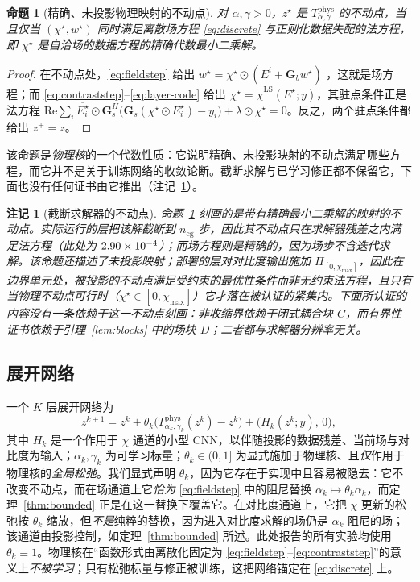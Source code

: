 \documentclass[UTF8,a4paper,11pt]{ctexart}
\newcommand{\numv}[1]{#1}
\newtheorem{Proposition}{命题}[section]
\newtheorem{Remark}{注记}[section]
\begin{document}
\begin{Proposition}[精确、未投影物理映射的不动点]\label{prop:fixpoint}
对 $\alpha,\gamma>0$，$z^\star$ 是 $T^{\mathrm{phys}}_{\alpha,\gamma}$ 的不动点，当且仅当 $(\chi^\star,w^\star)$ 同时满足离散场方程 \eqref{eq:discrete} 与正则化数据失配的法方程，即 $\chi^\star$ 是自洽场的数据方程的精确代数最小二乘解。
\end{Proposition}
\begin{proof}
在不动点处，\eqref{eq:fieldstep} 给出 $w^\star=\chi^\star\odot(E^i+\mathbf{G}_bw^\star)$
，这就是场方程；而 \eqref{eq:contraststep}--\eqref{eq:layer-code} 给出 $\chi^\star=
\hat\chi^{\mathrm{LS}}(E^\star;y)$，其驻点条件正是法方程
$\mathrm{Re}\sum_i \overline{E^\star_i}\odot\mathbf{G}_s^{H}\big(\mathbf{G}_s(\chi^\star\odot
E^\star_i)-y_i\big)+\lambda\odot\chi^\star=0$。反之，两个驻点条件都给出
$z^+=z$。
\end{proof}
该命题是\emph{物理核}的一个代数性质：它说明精确、未投影映射的不动点满足哪些方程，而它并不是关于训练网络的收敛论断。截断求解与已学习修正都不保留它，下面也没有任何证书由它推出（注记~\ref{rem:fixpointtrunc}）。
\begin{Remark}[截断求解器的不动点]\label{rem:fixpointtrunc}
命题~\ref{prop:fixpoint} 刻画的是带有\emph{精确}最小二乘解的映射的不动点。实际运行的层把该解截断到 $n_{\mathrm{cg}}$ 步，因此其不动点只在求解器残差之内满足法方程（此处为 $\numv{\NumCgResidImpl}$）；而场方程则是精确的，因为场步不含迭代求解。该命题还描述了\emph{未投影}映射；部署的层对对比度输出施加 $\Pi_{[0,\chi_{\max}]}$，因此在边界单元处，被投影的不动点满足受约束的最优性条件而非无约束法方程，且只有当物理不动点可行时（$\chi^\star\in[0,\chi_{\max}]$）它才落在被认证的紧集内。下面所认证的内容没有一条依赖于这一不动点刻画：非收缩界依赖于闭式耦合块 $C$，而有界性证书依赖于引理~\ref{lem:blocks} 中的场块 $D$；二者都与求解器分辨率无关。
\end{Remark}

\subsection{展开网络}
一个 $K$ 层展开网络为
\begin{equation}\label{eq:layer-code}
z^{k+1} = z^{k}+\theta_k\big(T^{\mathrm{phys}}_{\alpha_k,\gamma_k}(z^{k})-z^{k}\big)+\big(H_k(z^{k};y),\,0\big),
\end{equation}
其中 $H_k$ 是一个作用于 $\chi$ 通道的小型 CNN，以伴随投影的数据残差、当前场与对比度为输入；$\alpha_k,\gamma_k$ 为可学习标量；$\theta_k\in(0,1]$ 为显式施加于物理核、且\emph{仅}作用于物理核的\emph{全局松弛}。我们显式声明 $\theta_k$，因为它存在于实现中且容易被隐去：它不改变不动点，而在场通道上它\emph{恰为} \eqref{eq:fieldstep} 中的阻尼替换 $\alpha_k\mapsto\theta_k\alpha_k$，而定理~\ref{thm:bounded} 正是在这一替换下覆盖它。在对比度通道上，它把 $\chi$ 更新的松弛按 $\theta_k$ 缩放，但\emph{不是}纯粹的替换，因为进入对比度求解的场仍是 $\alpha_k$-阻尼的场；该通道由投影控制，如定理~\ref{thm:bounded} 所述。此处报告的所有实验均使用 $\theta_k\equiv1$。物理核在“函数形式由离散化固定为 \eqref{eq:fieldstep}--\eqref{eq:contraststep}”的意义上\emph{不被学习}；只有松弛标量与修正被训练，这把网络锚定在 \eqref{eq:discrete} 上。
\end{document}
